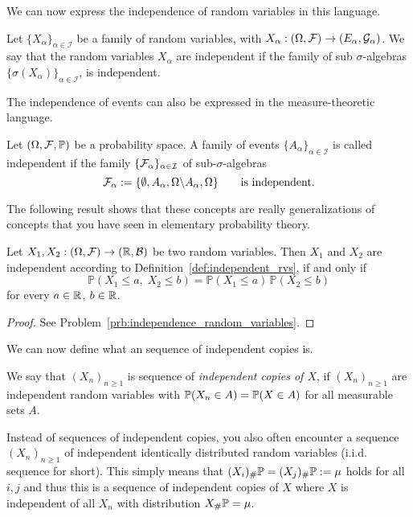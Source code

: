 We can now express the independence of random variables in this language.

\begin{definition}\label{def:independent_rvs}
	Let $\{X_\alpha\}_{\alpha \in \mathcal{I}}$ be a family of random variables, with $X_\alpha:(\Omega, \mathcal F) \to (E_\alpha, \mathcal{G}_\alpha)$. We say that the random variables $X_\alpha$ are independent if the family of sub $\sigma$-algebras $\{\sigma(X_\alpha)\}_{\alpha \in \mathcal{I}}$, is independent.
\end{definition}

The independence of events can also be expressed in the measure-theoretic language.

\begin{definition}
	Let $(\Omega, \mathcal F, \mathbb{P})$ be a probability space. A family of events $\{A_\alpha\}_{\alpha \in \mathcal{I}}$ is called independent if the family $\{ \mathcal F_\alpha \}_{\alpha\in\mathcal{I}}$ of sub-$\sigma$-algebras
	\[
	\mathcal F_\alpha := \{ \emptyset, A_\alpha, \Omega \backslash A_\alpha, \Omega \}\qquad\text{is independent.}
	\]	
\end{definition}

The following result shows that these concepts are really generalizations of concepts that you have seen in elementary probability theory.

\begin{lemma}\label{lem:independence_random_variables}
Let $X_1, X_2: (\Omega, \mathcal F) \to (\mathbb R, \mathcal B)$ be two random variables. Then $X_1$ and $X_2$ are independent according to Definition~\ref{def:independent_rvs}, if and only if 
	\[
	\mathbb{P}( X_1 \leq a,\; X_2 \leq b ) = \mathbb{P}(X_1 \leq a)\, \mathbb{P}(X_2 \leq b)
	\]
	for every $a \in \mathbb R$, $b \in \mathbb R$.
\end{lemma}

\begin{proof}
See Problem~\ref{prb:independence_random_variables}.
\end{proof}

We can now define what an sequence of independent copies is.

\begin{definition}\label{def:iid}
We say that $(X_n)_{n \ge 1}$ is sequence of \emph{independent copies of $X$}, if $(X_n)_{n \ge 1}$ are independent random variables with $\mathbb P(X_n \in A) = \mathbb P(X \in A)$ for all measurable sets $A$.
\end{definition}

\begin{remark}
Instead of sequences of independent copies, you also often encounter a sequence $(X_n)_{n\ge 1}$ of independent identically distributed random variables (i.i.d. sequence for short). This simply means that $(X_i)_\# \mathbb P = (X_j)_\# \mathbb P := \mu$ holds for all $i,j$ and thus this is a sequence of independent copies of $X$ where $X$ is independent of all $X_n$ with distribution $X_\# \mathbb P = \mu$.
\end{remark}

